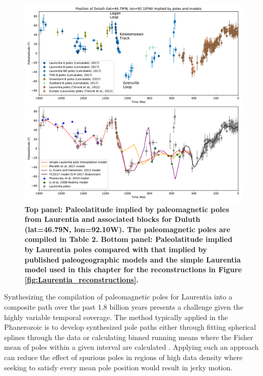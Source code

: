 \documentclass[11pt,letterpaper]{article}
\begin{document}
\begin{figure}
\centering
\includegraphics[width=\textwidth]{../Figures/Laurentia_paleolatitude.pdf}
\caption{\small{\textbf{Top panel: Paleolatitude implied by paleomagnetic poles from Laurentia and associated blocks for Duluth (lat=46.79\textdegree N, lon=92.10\textdegree W). The paleomagnetic poles are compiled in Table 2. Bottom panel: Paleolatitude implied by Laurentia poles compared with that implied by published paleogeographic models and the simple Laurentia model used in this chapter for the reconstructions in Figure \ref{fig:Laurentia_reconstructions}.}}}
\label{fig:Laurentia_paleolatitude}
\end{figure} 

Synthesizing the compilation of paleomagnetic poles for Laurentia into a composite path over the past 1.8 billion years presents a challenge given the highly variable temporal coverage. The method typically applied in the Phanerozoic is to develop synthesized pole paths either through fitting spherical splines through the data or calculating binned running means where the Fisher mean of poles within a given interval are calculated \citep{Torsvik2012a}. Applying such an approach can reduce the effect of spurious poles in regions of high data density where seeking to satisfy every mean pole position would result in jerky motion. 
\end{document}
